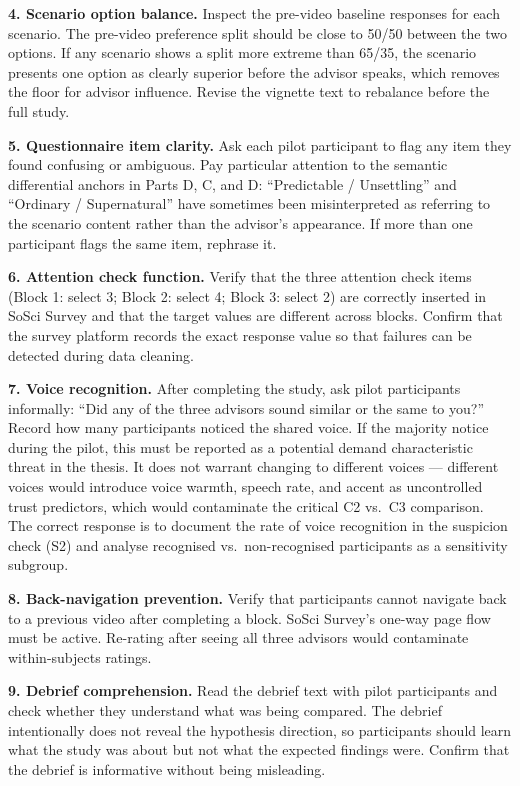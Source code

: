 \documentclass[11pt, a4paper]{article}
\begin{document}
\textbf{4. Scenario option balance.}
Inspect the pre-video baseline responses for each scenario. The pre-video preference split should be close to 50/50 between the two options. If any scenario shows a split more extreme than 65/35, the scenario presents one option as clearly superior before the advisor speaks, which removes the floor for advisor influence. Revise the vignette text to rebalance before the full study.

\textbf{5. Questionnaire item clarity.}
Ask each pilot participant to flag any item they found confusing or ambiguous. Pay particular attention to the semantic differential anchors in Parts D, C, and D: ``Predictable / Unsettling'' and ``Ordinary / Supernatural'' have sometimes been misinterpreted as referring to the scenario content rather than the advisor's appearance. If more than one participant flags the same item, rephrase it.

\textbf{6. Attention check function.}
Verify that the three attention check items (Block 1: select 3; Block 2: select 4; Block 3: select 2) are correctly inserted in SoSci Survey and that the target values are different across blocks. Confirm that the survey platform records the exact response value so that failures can be detected during data cleaning.

\textbf{7. Voice recognition.}
After completing the study, ask pilot participants informally: ``Did any of the three advisors sound similar or the same to you?'' Record how many participants noticed the shared voice. If the majority notice during the pilot, this must be reported as a potential demand characteristic threat in the thesis. It does not warrant changing to different voices --- different voices would introduce voice warmth, speech rate, and accent as uncontrolled trust predictors, which would contaminate the critical C2 vs.\ C3 comparison. The correct response is to document the rate of voice recognition in the suspicion check (S2) and analyse recognised vs.\ non-recognised participants as a sensitivity subgroup.

\textbf{8. Back-navigation prevention.}
Verify that participants cannot navigate back to a previous video after completing a block. SoSci Survey's one-way page flow must be active. Re-rating after seeing all three advisors would contaminate within-subjects ratings.

\textbf{9. Debrief comprehension.}
Read the debrief text with pilot participants and check whether they understand what was being compared. The debrief intentionally does not reveal the hypothesis direction, so participants should learn what the study was about but not what the expected findings were. Confirm that the debrief is informative without being misleading.
\end{document}
